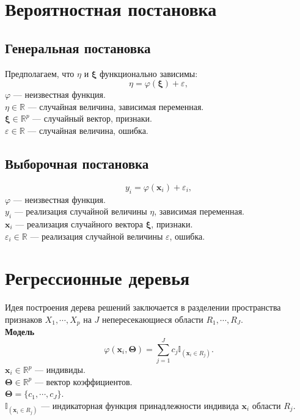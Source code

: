 \documentclass{article}
\begin{document}
\newpage

\section{Вероятностная постановка}

\subsection{Генеральная постановка}

Предполагаем, что $\eta$ и $\bm{\xi}$ функционально зависимы:
\begin{equation}
	\eta = \varphi(\bm{\xi}) + \varepsilon,
\end{equation}
$\varphi$ --- неизвестная функция.\\
$\eta \in \mathbb{R}$ --- случайная величина, зависимая переменная.\\
$\bm{\xi} \in \mathbb{R}^p$ --- случайный вектор, признаки.\\
$\varepsilon \in \mathbb{R}$ --- случайная величина, ошибка.\\

\subsection{Выборочная постановка}

\begin{equation}
	y_i = \varphi(\textbf{x}_i) + \varepsilon_i,
\end{equation}
\noindent$\varphi$ --- неизвестная функция.\\
$y_i$ --- реализация случайной величины $\eta$, зависимая переменная.\\
$\textbf{x}_i$ --- реализация случайного вектора $\bm{\xi}$, признаки.\\
$\varepsilon_i \in \mathbb{R}$ --- реализация случайной величины $\varepsilon$, ошибка.\\

\newpage

\section{Регрессионные деревья}
Идея построения дерева решений заключается в разделении пространства признаков $X_1, \cdots, X_p$ на $J$ непересекающиеся области $R_1, \cdots, R_J$.\\

\noindent \textbf{Модель}
\begin{equation}
	\varphi(\textbf{x}_i, \bm{\Theta}) = \sum\limits_{j=1}^{J} c_j \mathbb{I}_{(\textbf{x}_i \in R_j)}.
\end{equation}
$\textbf{x}_i \in \mathbb{R}^p$ --- индивиды.\\
$\bm{\Theta} \in \mathbb{R}^p$ --- вектор коэффициентов.\\
$\bm{\Theta} = \{ c_1, \cdots, c_J \}$.\\
$\mathbb{I}_{(\textbf{x}_i \in R_j)}$ --- индикаторная функция принадлежности индивида $\textbf{x}_i$ области $R_j$.\\
\end{document}
